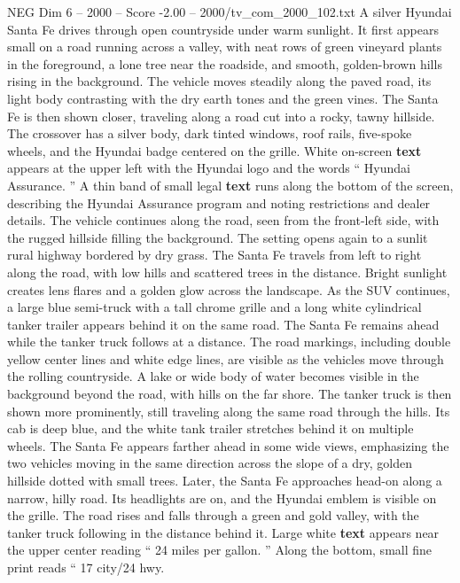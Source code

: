 \begin{textsample}{NEG Dim 6 – 2000 – Score -2.00 – 2000/tv\_com\_2000\_102.txt}  \label{ex:f6_neg_044}
A silver Hyundai Santa Fe drives through open countryside under warm sunlight.
It first appears small on a road running across a valley, with neat rows of green vineyard plants in the foreground, a lone tree near the roadside, and smooth, golden-brown hills rising in the background.
The vehicle moves steadily along the paved road, its light body contrasting with the dry earth tones and the green vines.
The Santa Fe is then shown closer, traveling along a road cut into a rocky, tawny hillside.
The crossover has a silver body, dark tinted windows, roof rails, five-spoke wheels, and the Hyundai badge centered on the grille.
White on-screen \textbf{text} appears at the upper left with the Hyundai logo and the words “ Hyundai Assurance. ” A thin band of small legal \textbf{text} runs along the bottom of the screen, describing the Hyundai Assurance program and noting restrictions and dealer details.
The vehicle continues along the road, seen from the front-left side, with the rugged hillside filling the background.
The setting opens again to a sunlit rural highway bordered by dry grass.
The Santa Fe travels from left to right along the road, with low hills and scattered trees in the distance.
Bright sunlight creates lens flares and a golden glow across the landscape.
As the SUV continues, a large blue semi-truck with a tall chrome grille and a long white cylindrical tanker trailer appears behind it on the same road.
The Santa Fe remains ahead while the tanker truck follows at a distance.
The road markings, including double yellow center lines and white edge lines, are visible as the vehicles move through the rolling countryside.
A lake or wide body of water becomes visible in the background beyond the road, with hills on the far shore.
The tanker truck is then shown more prominently, still traveling along the same road through the hills.
Its cab is deep blue, and the white tank trailer stretches behind it on multiple wheels.
The Santa Fe appears farther ahead in some wide views, emphasizing the two vehicles moving in the same direction across the slope of a dry, golden hillside dotted with small trees.
Later, the Santa Fe approaches head-on along a narrow, hilly road.
Its headlights are on, and the Hyundai emblem is visible on the grille.
The road rises and falls through a green and gold valley, with the tanker truck following in the distance behind it.
Large white \textbf{text} appears near the upper center reading “ 24 miles per gallon. ” Along the bottom, small fine print reads “ 17 city/24 hwy.

\end{textsample}
